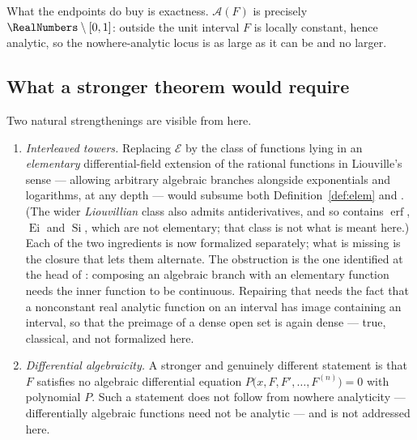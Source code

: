 \documentclass[11pt,oneside]{article}
\theoremstyle{definition}
\theoremstyle{remark}
\newcommand{\Elem}{\mathcal E}
\newcommand{\An}{\mathcal A}
\begin{document}
What the endpoints do buy is exactness.  $\An(F)$ is precisely
$\RealNumbers\setminus[0,1]$: outside the unit interval $F$ is locally constant, hence
analytic, so the nowhere-analytic locus is as large as it can be and no
larger.

\subsection{What a stronger theorem would require}

Two natural strengthenings are visible from here.

\begin{enumerate}
\item \emph{Interleaved towers.}  Replacing $\Elem$ by the class of functions
      lying in an \emph{elementary} differential-field extension of the
      rational functions in Liouville's sense --- allowing arbitrary algebraic
      branches alongside exponentials and logarithms, at any depth --- would
      subsume both Definition~\ref{def:elem} and .
      (The wider \emph{Liouvillian} class also
      admits antiderivatives, and so contains $\operatorname{erf}$,
      $\operatorname{Ei}$ and $\operatorname{Si}$, which are not elementary;
      that class is not what is meant here.)  Each of the two ingredients is
      now formalized separately; what is missing is the closure that lets them
      alternate.  The obstruction is the one identified at the head of
      : composing an algebraic branch with an elementary
      function needs the inner function to be continuous.  Repairing that
      needs the fact that a nonconstant real analytic function on an interval
      has image containing an interval, so that the preimage of a dense open
      set is again dense --- true, classical, and not formalized here.
\item \emph{Differential algebraicity.}  A stronger and genuinely different
      statement is that $F$ satisfies no algebraic differential equation
      $P\bigl(x,F,F',\ldots,F^{(n)}\bigr)=0$ with polynomial $P$.  Such a
      statement does not follow from nowhere analyticity --- differentially
      algebraic functions need not be analytic --- and is not addressed here.
\end{enumerate}
\end{document}
